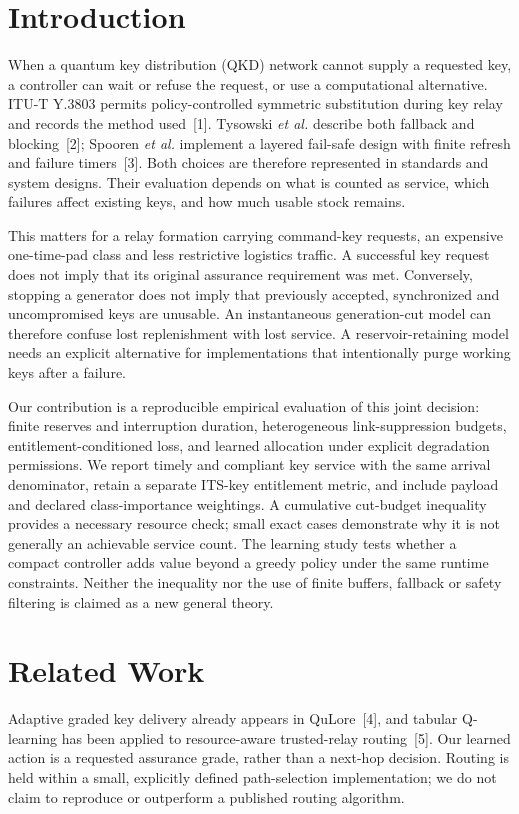 \documentclass[conference,a4paper]{IEEEtran}
\begin{document}
\section{Introduction}
When a quantum key distribution (QKD) network cannot supply a requested key, a controller can wait or refuse the request, or use a computational alternative. ITU-T Y.3803 permits policy-controlled symmetric substitution during key relay and records the method used~[1]. Tysowski \emph{et al.} describe both fallback and blocking~[2]; Spooren \emph{et al.} implement a layered fail-safe design with finite refresh and failure timers~[3]. Both choices are therefore represented in standards and system designs. Their evaluation depends on what is counted as service, which failures affect existing keys, and how much usable stock remains.

This matters for a relay formation carrying command-key requests, an expensive one-time-pad class and less restrictive logistics traffic. A successful key request does not imply that its original assurance requirement was met. Conversely, stopping a generator does not imply that previously accepted, synchronized and uncompromised keys are unusable. An instantaneous generation-cut model can therefore confuse lost replenishment with lost service. A reservoir-retaining model needs an explicit alternative for implementations that intentionally purge working keys after a failure.

Our contribution is a reproducible empirical evaluation of this joint decision: finite reserves and interruption duration, heterogeneous link-suppression budgets, entitlement-conditioned loss, and learned allocation under explicit degradation permissions. We report timely and compliant key service with the same arrival denominator, retain a separate ITS-key entitlement metric, and include payload and declared class-importance weightings. A cumulative cut-budget inequality provides a necessary resource check; small exact cases demonstrate why it is not generally an achievable service count. The learning study tests whether a compact controller adds value beyond a greedy policy under the same runtime constraints. Neither the inequality nor the use of finite buffers, fallback or safety filtering is claimed as a new general theory.

\section{Related Work}
Adaptive graded key delivery already appears in QuLore~[4], and tabular Q-learning has been applied to resource-aware trusted-relay routing~[5]. Our learned action is a requested assurance grade, rather than a next-hop decision. Routing is held within a small, explicitly defined path-selection implementation; we do not claim to reproduce or outperform a published routing algorithm.
\end{document}
